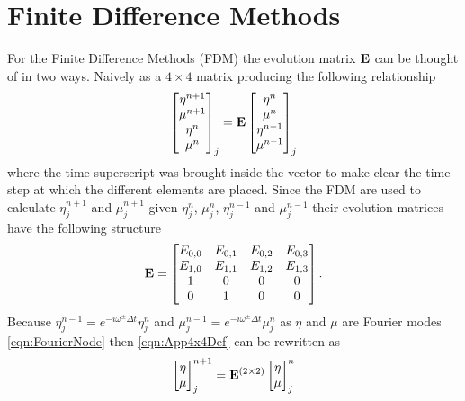 \section{Finite Difference Methods}
For the Finite Difference Methods (FDM) the evolution matrix $\mathbf{E}$ can be thought of in two ways. Naively as a $4\times4$ matrix producing the following relationship
\begin{equation}
\label{eqn:App4x4Def}
\begin{bmatrix}
{\eta}^{n+1} \\{\mu}^{n+1} \\ {\eta}^{n} \\{\mu}^{n} 
\end{bmatrix}_j = \mathbf{E} \begin{bmatrix}{\eta}^{n} \\{\mu}^{n} \\ {\eta}^{n-1} \\{\mu}^{n-1} 
\end{bmatrix}_j
\end{equation} 
where the time superscript was brought inside the vector to make clear the time step at which the different elements are placed. Since the FDM are used to calculate ${\eta}^{n+1}_j$ and $\mu^{n+1}_j$ given ${\eta}^{n}_j$, $\mu^{n}_j$, ${\eta}^{n-1}_j$ and $\mu^{n-1}_j$ their evolution matrices have the following structure
\begin{equation}
\label{eqn:App4x4}
\mathbf{E} = \begin{bmatrix}E_{0,0} & E_{0,1} & E_{0,2} & E_{0,3}\\
E_{1,0} & E_{1,1} & E_{1,2} & E_{1,3}\\
1 & 0 & 0 & 0\\
0 & 1 & 0 & 0\\
\end{bmatrix}.
\end{equation}
Because ${\eta}^{n-1}_j = e^{-i \omega^\pm \Delta t}{\eta}^{n}_j $ and ${\mu}^{n-1}_j = e^{-i \omega^\pm \Delta t}{\mu}^{n}_j$ as $\eta$ and $\mu$ are Fourier modes \eqref{eqn:FourierNode} then \eqref{eqn:App4x4Def} can be rewritten as
\begin{equation}
\begin{bmatrix}
{\eta} \\{\mu}
\end{bmatrix}^{n+1} _j = \mathbf{E}^{\left(2 \times 2\right)} \begin{bmatrix}{\eta} \\{\mu}
\end{bmatrix}^{n}_j
\end{equation}  
